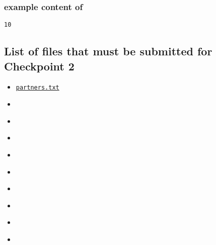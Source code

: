 \hypertarget{jailtimeformat}{}
\subsubsection*{example content of \texttt{\hyperlink{cp2jailtime}{\filejailtime}}}
\begin{mdframed}
\begin{Verbatim}
10
\end{Verbatim}
\end{mdframed}

\subsection*{List of files that must be submitted for Checkpoint 2}

\begin{itemize}
\item \texttt{\hyperlink{cp2partners}{partners.txt}}
\item \texttt{\hyperlink{cp2wep}{\filewep}}
\item \texttt{\hyperlink{cp2clientip}{\fileclientip}}
\item \texttt{\hyperlink{cp2serverip}{\fileserverip}}
\item \texttt{\hyperlink{cp2protocol}{\fileprotocol}}
\item \texttt{\hyperlink{cp2priv}{\filepriv}}
\item \texttt{\hyperlink{cp2cred}{\filecred}}
\item \texttt{\hyperlink{cp2secret}{\filesecret}}
\item \texttt{\hyperlink{cp2jailtime}{\filejailtime}}
\item \texttt{\hyperlink{cp2anomaly}{\fileanomaly}}
\end{itemize}
